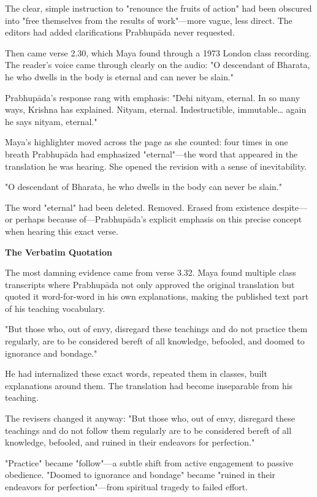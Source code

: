 \documentclass[12pt,twoside]{book}
\begin{document}
The clear, simple instruction to "renounce the fruits of action" had been obscured into "free themselves from the results of work"—more vague, less direct. The editors had added clarifications Prabhupāda never requested.

Then came verse 2.30, which Maya found through a 1973 London class recording. The reader's voice came through clearly on the audio: "O descendant of Bharata, he who dwells in the body is eternal and can never be slain."

Prabhupāda's response rang with emphasis: "Dehi nityam, eternal. In so many ways, Krishna has explained. Nityam, eternal. Indestructible, immutable\ldots{} again he says nityam, eternal."

Maya's highlighter moved across the page as she counted: four times in one breath Prabhupāda had emphasized "eternal"—the word that appeared in the translation he was hearing. She opened the revision with a sense of inevitability.

"O descendant of Bharata, he who dwells in the body can never be slain."

The word "eternal" had been deleted. Removed. Erased from existence despite—or perhaps because of—Prabhupāda's explicit emphasis on this precise concept when hearing this exact verse.


\vspace{0.5cm}
\textbf{The Verbatim Quotation}
\vspace{0.2cm}


The most damning evidence came from verse 3.32. Maya found multiple class transcripts where Prabhupāda not only approved the original translation but quoted it word-for-word in his own explanations, making the published text part of his teaching vocabulary.

"But those who, out of envy, disregard these teachings and do not practice them regularly, are to be considered bereft of all knowledge, befooled, and doomed to ignorance and bondage."

He had internalized these exact words, repeated them in classes, built explanations around them. The translation had become inseparable from his teaching.

The revisers changed it anyway: "But those who, out of envy, disregard these teachings and do not follow them regularly are to be considered bereft of all knowledge, befooled, and ruined in their endeavors for perfection."

"Practice" became "follow"—a subtle shift from active engagement to passive obedience. "Doomed to ignorance and bondage" became "ruined in their endeavors for perfection"—from spiritual tragedy to failed effort.
\end{document}
